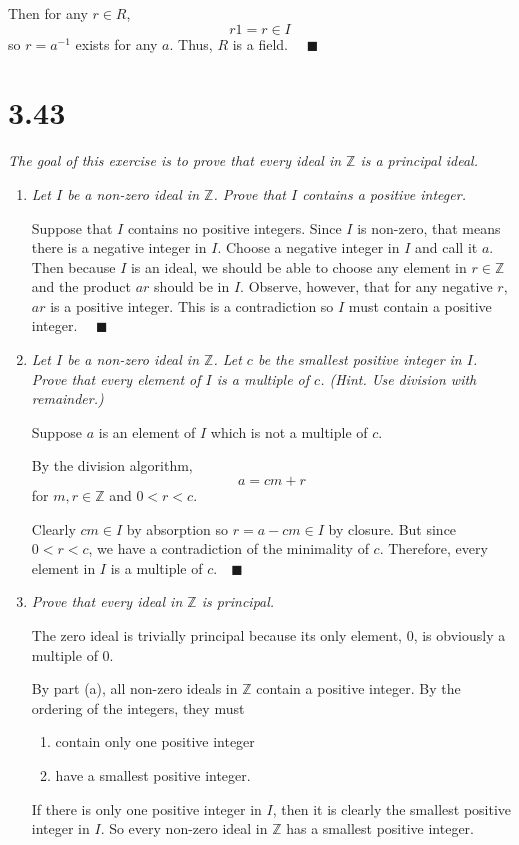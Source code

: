 \documentclass[12pt]{article}
\newcommand{\Z}{\mathbb{Z}}
\newcommand{\qed}{\quad \blacksquare}
\begin{document}
            Then for any $r \in R$,
            \[r1 = r \in I\]
            so $r = a^{-1}$ exists for any $a$. Thus, $R$ is a field. $\qed$
        \color{black}
\pagebreak

\section*{3.43}
    \emph{The goal of this exercise is to prove that every ideal in $\Z$ is a principal ideal.}
    \begin{enumerate}[label=(\alph*)]
        \item \emph{Let $I$ be a non-zero ideal in $\Z$. Prove that $I$ contains a positive integer.}
        
            \color{blue}
                Suppose that $I$ contains no positive integers. Since $I$ is non-zero, that means there is a negative integer in $I$. Choose a negative integer in $I$ and call it $a$. Then because $I$ is an ideal, we should be able to choose any element in $r \in \Z$ and the product $ar$ should be in $I$. Observe, however, that for any negative $r$, $ar$ is a positive integer. This is a contradiction so $I$ must contain a positive integer. $\qed$
            \color{black}
        
        \item \emph{Let $I$ be a non-zero ideal in $\Z$. Let $c$ be the smallest positive integer in $I$. Prove that every
        element of $I$ is a multiple of $c$. (Hint. Use division with remainder.)}

            \color{blue}
                Suppose $a$ is an element of $I$ which is not a multiple of $c$. 
                
                By the division algorithm, 
                \[a = cm + r\]
                for $m, r \in \Z$ and $0 < r < c$.

                Clearly $cm \in I$ by absorption so $r = a - cm \in I$ by closure. But since $0 < r < c$, we have a contradiction of the minimality of $c$. Therefore, every element in $I$ is a multiple of $c. \qed$
            \color{black}

        \item \emph{Prove that every ideal in $\Z$ is principal.}
        
            \color{blue}
                The zero ideal is trivially principal because its only element, $0$, is obviously a multiple of $0$. 

                By part (a), all non-zero ideals in $\Z$ contain a positive integer. By the ordering of the integers, they must 
                \begin{enumerate}
                    \item contain only one positive integer 
                    \item have a smallest positive integer. 
                \end{enumerate}
                If there is only one positive integer in $I$, then it is clearly the smallest positive integer in $I$. So every non-zero ideal in $\Z$ has a smallest positive integer. 


\end{enumerate}
\end{document}
